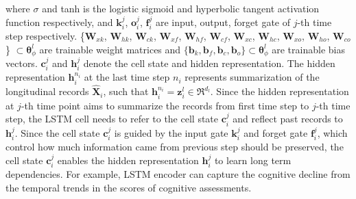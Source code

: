 where $\sigma$ and tanh is the logistic sigmoid and hyperbolic tangent activation function respectively, and $\mathbf{k}^j_i$, $\mathbf{o}^j_i$, $\mathbf{f}^j_i$ are input, output, forget gate of $j$-th time step respectively. \{$\mathbf{W}_{xk}$, $\mathbf{W}_{hk}$, $\mathbf{W}_{ck}$, $\mathbf{W}_{xf}$, $\mathbf{W}_{hf}$, $\mathbf{W}_{cf}$, $\mathbf{W}_{xc}$, $\mathbf{W}_{hc}$, $\mathbf{W}_{xo}$, $\mathbf{W}_{ho}$, $\mathbf{W}_{co}$\} $\subset \mathbf{\theta}_{\phi}^l$ are trainable weight matrices and $\{\mathbf{b}_k, \mathbf{b}_f, \mathbf{b}_c, \mathbf{b}_o\} \subset \mathbf{\theta}_{\phi}^l$ are trainable bias vectors. $\mathbf{c}_i^j$ and $\mathbf{h}_i^j$ denote the cell state and hidden representation. The hidden representation $\mathbf{h}_i^{n_i}$ at the last time step $n_i$ represents summarization of the longitudinal records $\hat{\mathbf{X}}_i$, such that $\mathbf{h}_i^{n_i} = \mathbf{z}_i^l \in \Re^{d_l}$. Since the hidden representation at $j$-th time point aims to summarize the records from first time step to $j$-th time step, the LSTM cell needs to refer to the cell state $\mathbf{c}_i^j$ and reflect past records to $\mathbf{h}_i^j$. Since the cell state $\mathbf{c}_i^j$ is guided by the input gate $\mathbf{k}_i^j$ and forget gate $\mathbf{f}_i^j$, which control how much information came from previous step should be preserved, the cell state $\mathbf{c}_i^j$ enables the hidden representation $\mathbf{h}_i^j$ to learn long term dependencies. For example, LSTM encoder can capture the cognitive decline from the temporal trends in the scores of cognitive assessments.

